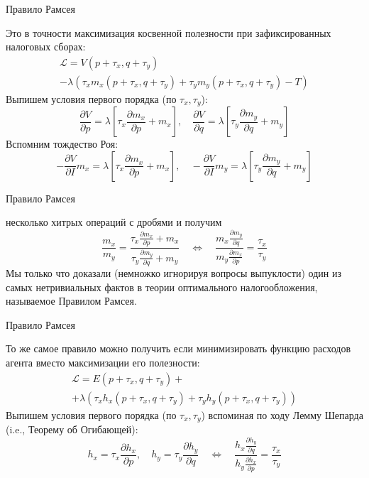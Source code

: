 \documentclass{beamer}
\begin{document}
\begin{frame}{Правило Рамсея}

Это в точности максимизация косвенной полезности при зафиксированных налоговых сборах:
\begin{gather*}
\mathcal{L} = V(p+\tau_x,q+\tau_y) \\ - \lambda (\tau_x m_x(p+ \tau_x,q+\tau_y) + \tau_y m_y(p+ \tau_x,q+\tau_y) - T)
\end{gather*}
Выпишем условия первого порядка (по $\tau_x, \tau_y$):
$$\frac{\partial V}{\partial p} = \lambda [\tau_x \frac{\partial m_x}{\partial p} + m_x], \quad \frac{\partial V}{\partial q} = \lambda [\tau_y \frac{\partial m_y}{\partial q}+m_y]$$
Вспомним тождество Роя:
$$-\frac{\partial V}{\partial I}m_x = \lambda [\tau_x \frac{\partial m_x}{\partial p}+m_x], \quad -\frac{\partial V}{\partial I}m_y = \lambda [\tau_y \frac{\partial m_y}{\partial q}+m_y]$$
\end{frame}

\begin{frame}{Правило Рамсея}

несколько хитрых операций с дробями и получим
$$ \frac{m_x}{m_y} = \frac{\tau_x \frac{\partial m_x}{\partial p} + m_x}{\tau_y \frac{\partial m_y}{\partial q}+m_y} \quad \Leftrightarrow \quad \frac{m_x \frac{\partial m_y}{\partial q}}{m_y \frac{\partial m_x}{\partial p}} = \frac{\tau_x}{\tau_y}$$
Мы только что доказали (немножко игнорируя вопросы выпуклости) один из самых нетривиальных фактов в теории оптимального налогообложения, называемое Правилом Рамсея.

\end{frame}

\begin{frame}{Правило Рамсея}

То же самое правило можно получить если минимизировать функцию расходов агента вместо максимизации его полезности:
\begin{gather*}
\mathcal{L} = E(p+ \tau_x,q+\tau_y) + \\ + \lambda (\tau_x h_x(p+ \tau_x,q+\tau_y) + \tau_y h_y(p+ \tau_x,q+\tau_y))
\end{gather*}
Выпишем условия первого порядка (по $\tau_x, \tau_y$) вспоминая по ходу Лемму Шепарда (i.e., Теорему об Огибающей):
$$ h_x = \tau_x \frac{\partial h_x}{\partial p}, \quad h_y = \tau_y \frac{\partial h_y}{\partial q} \quad \Leftrightarrow \quad \frac{h_x \frac{\partial h_y}{\partial q}}{h_y \frac{\partial h_x}{\partial p}} = \frac{\tau_x}{\tau_y}$$

\end{frame}
\end{document}
